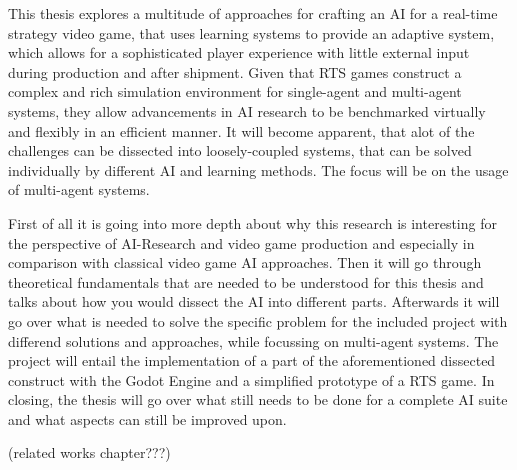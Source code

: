 
\Abstract
This thesis explores a multitude of approaches for crafting an AI for a real-time strategy video game, that uses learning systems to provide an adaptive system, which allows for a sophisticated player experience with little external input during production and after shipment. Given that RTS games construct a complex and rich simulation environment for single-agent and multi-agent systems, they allow advancements in AI research to be benchmarked virtually and flexibly in an efficient manner. It will become apparent, that alot of the challenges can be dissected into loosely-coupled systems, that can be solved individually by different AI and learning methods. The focus will be on the usage of multi-agent systems. 
\bigskip

First of all it is going into more depth about why this research is interesting for the perspective of AI-Research and video game production and especially in comparison with classical video game AI approaches. Then it will go through theoretical fundamentals that are needed to be understood for this thesis and talks about how you would dissect the AI into different parts. Afterwards it will go over what is needed to solve the specific problem for the included project with differend solutions and approaches, while focussing on multi-agent systems. The project will entail the implementation of a part of the aforementioned dissected construct with the Godot Engine and a simplified prototype of a RTS game. In closing, the thesis will go over what still needs to be done for a complete AI suite and what aspects can still be improved upon.

(related works chapter???)